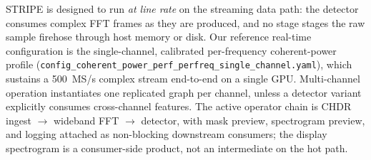 %
%



STRIPE is designed to run \emph{at line rate} on the streaming data path: the
detector consumes complex FFT frames as they are produced, and no stage stages the
raw sample firehose through host memory or disk. Our reference real-time
configuration is the single-channel, calibrated per-frequency coherent-power profile
(\texttt{config\_coherent\_power\_perf\_perfreq\_single\_channel.yaml}), which
sustains a \SI{500}{MS/s} complex stream end-to-end on a single GPU. Multi-channel
operation instantiates one replicated graph per channel, unless a detector variant
explicitly consumes cross-channel features. The active operator chain is CHDR
ingest $\rightarrow$ wideband FFT $\rightarrow$ detector, with mask preview,
spectrogram preview, and logging attached as non-blocking downstream consumers;
the display spectrogram is a consumer-side product, not an intermediate on the hot
path.


